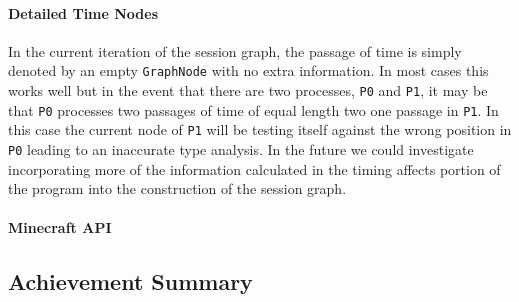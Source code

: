 \documentclass[11pt, abstracton, twoside]{scrartcl}
\begin{document}
\paragraph{Detailed Time Nodes}
In the current iteration of the session graph, the passage of time is simply
denoted by an empty \texttt{GraphNode} with no extra information. In most cases
this works well but in the event that there are two processes, \texttt{P0} and
\texttt{P1}, it may be that \texttt{P0} processes two passages of time of equal
length two one passage in \texttt{P1}. In this case the current node of 
\texttt{P1} will be testing itself against the wrong position in \texttt{P0} 
leading to an inaccurate type analysis. In the future we could investigate
incorporating more of the information calculated in the timing affects portion
of the program into the construction of the session graph.

\paragraph{Minecraft API}

\subsection{Achievement Summary}
\newpage
\end{document}
